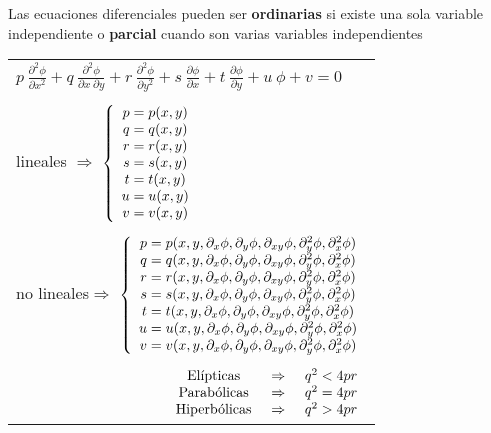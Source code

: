 \documentclass[spanish,titlepage,11pt]{article}
\begin{document}
Las ecuaciones diferenciales pueden ser \textbf{ordinarias} si existe una sola
va\-ria\-ble independiente o \textbf{parcial} cuando son varias variables
independientes\newline
\begin{tabular}
[c]{l}%
$p\ \frac{\partial^{2}\phi}{\partial x^{2}}+q\ \frac{\partial^{2}\phi
}{\partial x\ \partial y}+r\ \frac{\partial^{2}\phi}{\partial y^{2}}%
+s\ \frac{\partial\phi}{\partial x}+t\ \frac{\partial\phi}{\partial y}%
+u\ \phi+v=0$\\
\\
lineales \qquad$\Rightarrow$ $\left\{
\begin{array}
[c]{c}%
p=p(x,y)\\
q=q(x,y)\\
r=r(x,y)\\
s=s(x,y)\\
t=t(x,y)\\
u=u(x,y)\\
v=v(x,y)
\end{array}
\right.  $\\
\\
no lineales\qquad$\Rightarrow$ $\left\{
\begin{array}
[c]{c}%
p=p(x,y,\partial_{x}\phi,\partial_{y}\phi,\partial_{xy}\phi,\partial_{y}%
^{2}\phi,\partial_{x}^{2}\phi)\\
q=q(x,y,\partial_{x}\phi,\partial_{y}\phi,\partial_{xy}\phi,\partial_{y}%
^{2}\phi,\partial_{x}^{2}\phi)\\
r=r(x,y,\partial_{x}\phi,\partial_{y}\phi,\partial_{xy}\phi,\partial_{y}%
^{2}\phi,\partial_{x}^{2}\phi)\\
s=s(x,y,\partial_{x}\phi,\partial_{y}\phi,\partial_{xy}\phi,\partial_{y}%
^{2}\phi,\partial_{x}^{2}\phi)\\
t=t(x,y,\partial_{x}\phi,\partial_{y}\phi,\partial_{xy}\phi,\partial_{y}%
^{2}\phi,\partial_{x}^{2}\phi)\\
u=u(x,y,\partial_{x}\phi,\partial_{y}\phi,\partial_{xy}\phi,\partial_{y}%
^{2}\phi,\partial_{x}^{2}\phi)\\
v=v(x,y,\partial_{x}\phi,\partial_{y}\phi,\partial_{xy}\phi,\partial_{y}%
^{2}\phi,\partial_{x}^{2}\phi)
\end{array}
\right.  $\\
\\
\multicolumn{1}{r}{$\left.
\begin{array}
[c]{c}%
\text{El\'{\i}pticas}\\
\text{Parab\'{o}licas}\\
\text{Hiperb\'{o}licas}%
\end{array}
\right.  \left.
\begin{array}
[c]{c}%
\Rightarrow\\
\Rightarrow\\
\Rightarrow
\end{array}
\right.  \left.
\begin{array}
[c]{c}%
q^{2}<4pr\\
q^{2}=4pr\\
q^{2}>4pr
\end{array}
\right.  $}%
\end{tabular}
\end{document}
